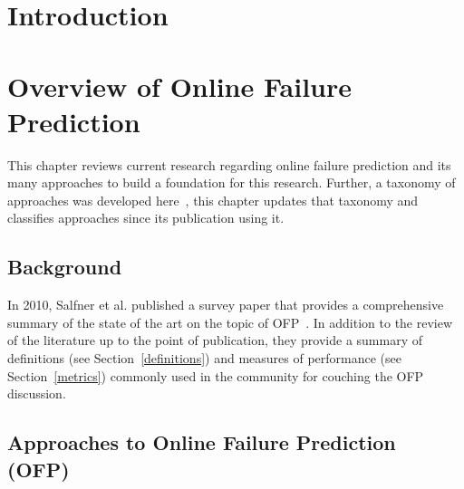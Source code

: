 \documentclass[12pt,letterpaper,oneside]{book}
\begin{document}
\frontmatter
	\flyleaf                        
	\disclaimerpage                 
	\titlepageAFIT                      
	\committeepage  
	
	
	\tableofcontents
	\listoffigures
	\listoftables
\mainmatter

\chapter{Introduction}


\chapter{Overview of Online Failure Prediction} \label{chapter2}
This chapter reviews current research regarding online failure prediction and
its many approaches to build a foundation for this research.  Further, a
taxonomy of approaches was developed here~\cite{salfnerSurvey}, this chapter
updates that taxonomy and classifies approaches since its publication using it.

\section{Background} \label{background}
In 2010, Salfner et al. published a survey paper that provides a comprehensive
summary of the state of the art on the topic of OFP~\cite{salfnerSurvey}.  In
addition to the review of the literature up to the point of publication, they
provide a summary of definitions (see Section~\ref{definitions}) and measures
of performance (see Section~\ref{metrics}) commonly used in the community for
couching the OFP discussion.




\section{Approaches to Online Failure Prediction (OFP)} \label{approaches}




\end{document}
